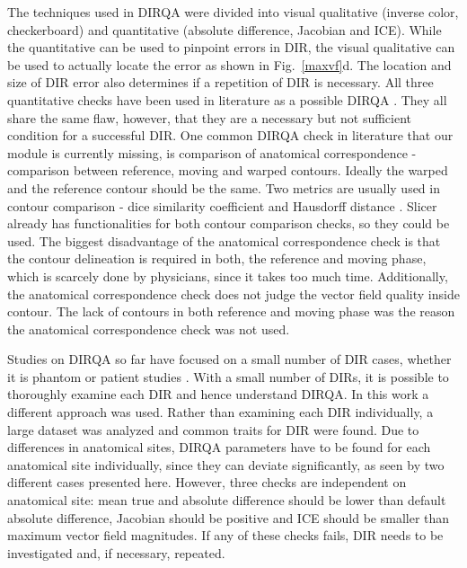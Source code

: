 The techniques used in DIRQA were divided into visual qualitative (inverse color, checkerboard) and quantitative (absolute difference, Jacobian and ICE). While the quantitative can be used to pinpoint errors in DIR, the visual qualitative
can be used to actually locate the error as shown in Fig.~\ref{maxvf}d. The location and size of DIR error also determines if a repetition of DIR is necessary.
All three quantitative checks have been used in literature as a possible DIRQA \cite{Varadhan2013, Leow2007, Christensen2001, Bender2009}.
They all share the same flaw, however, that they are a necessary but not sufficient condition for a successful DIR. 
One common DIRQA check in literature that our module is currently missing, is comparison of anatomical correspondence - 
comparison between reference, moving and warped contours. Ideally the warped and the reference contour should be the same. Two metrics are usually used in contour comparison -
dice similarity coefficient \cite{Varadhan2013} and Hausdorff distance \cite{Huttenlocher1993}. Slicer already has functionalities for both contour comparison checks, so they could be used. 
The biggest disadvantage of the anatomical correspondence check is that the contour delineation is required in both, the reference and moving phase, which is scarcely done by physicians, 
since it takes too much time. Additionally, the anatomical correspondence check does not judge the vector field quality inside contour.
The lack of contours in both reference and moving phase was the reason the anatomical correspondence check was not used.

Studies on DIRQA so far have focused on a small number of DIR cases, whether it is phantom \cite{Mutic2001,Moore2004} or patient studies \cite{Wu2008, Varadhan2013}. With a small number of DIRs,
it is possible to thoroughly examine each DIR and hence understand DIRQA. In this work a different approach was
used. Rather than examining each DIR individually, a large dataset was analyzed and common traits for DIR were found. Due to differences in anatomical sites, 
DIRQA parameters have to be found for each anatomical site individually, since they can
deviate significantly, as seen by two different cases presented here. However, three checks are independent on anatomical site: mean true and absolute difference should be lower than 
default absolute difference, Jacobian should be positive and ICE should be smaller than maximum vector field magnitudes. 
If any of these checks fails, DIR needs to be investigated and, if necessary, repeated.

